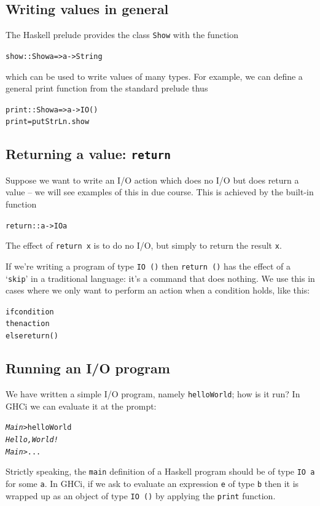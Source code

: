\subsection*{Writing values in general}

The Haskell prelude provides the class \texttt{Show}
with the function
\begin{alltt}
show :: Show a => a -> String
\end{alltt}
which can be used to write values of many types. For example, we
can define a general print function from the standard prelude thus
\begin{alltt}
print :: Show a => a -> IO ()
print = putStrLn . show
\end{alltt}

\subsection*{Returning a value: \texttt{return}}

Suppose we want to write an I/O action which does no I/O but does return
a value -- we will see examples of this in due course. This is achieved 
by the built-in function
\begin{alltt}
return :: a -> IO a
\end{alltt}
The effect of \texttt{return x} is to do no I/O, but simply to return the
result \texttt{x}. 

If we're writing a program of type \texttt{IO ()} then \texttt{return ()} has the effect of a `\texttt{skip}' in a traditional language: it's a command that does nothing. We use this in cases where we only want to perform an action when a condition holds, like this:
\begin{alltt}
if condition
  then action
  else return ()
\end{alltt}




\subsection*{Running an I/O program}

We have written a simple I/O program, namely \texttt{helloWorld}; how is
it run? In GHCi we can evaluate it at the prompt:
\begin{alltt}
\textsl{Main>} helloWorld
\textsl{Hello, World!}
\textsl{Main>} ...
\end{alltt}
Strictly speaking, the \texttt{main} definition of a Haskell
program should be of type \texttt{IO a} for some \texttt{a}. In GHCi, if
we ask to evaluate an expression \texttt{e} of type \texttt{b}
then it is wrapped up as an object of type \texttt{IO ()} by applying
the
\texttt{print} function.
\medskip

